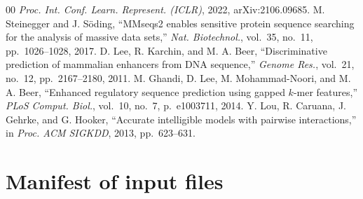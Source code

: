 \documentclass[journal,onecolumn,10pt,letterpaper]{IEEEtran}
\begin{document}
\begin{thebibliography}{00}
\emph{Proc. Int. Conf. Learn. Represent. (ICLR)}, 2022, arXiv:2106.09685.
 M. Steinegger and J. S\"oding, ``MMseqs2 enables sensitive protein sequence
searching for the analysis of massive data sets,'' \emph{Nat. Biotechnol.}, vol.~35, no.~11,
pp.~1026--1028, 2017.
 D. Lee, R. Karchin, and M. A. Beer, ``Discriminative prediction of mammalian enhancers
from DNA sequence,'' \emph{Genome Res.}, vol.~21, no.~12, pp.~2167--2180, 2011.
 M. Ghandi, D. Lee, M. Mohammad-Noori, and M. A. Beer, ``Enhanced regulatory sequence
prediction using gapped $k$-mer features,'' \emph{PLoS Comput. Biol.}, vol.~10, no.~7, p.~e1003711, 2014.
 Y. Lou, R. Caruana, J. Gehrke, and G. Hooker, ``Accurate intelligible models with
pairwise interactions,'' in \emph{Proc. ACM SIGKDD}, 2013, pp.~623--631.
\end{thebibliography}

\clearpage
\section*{Manifest of input files}

\end{document}
